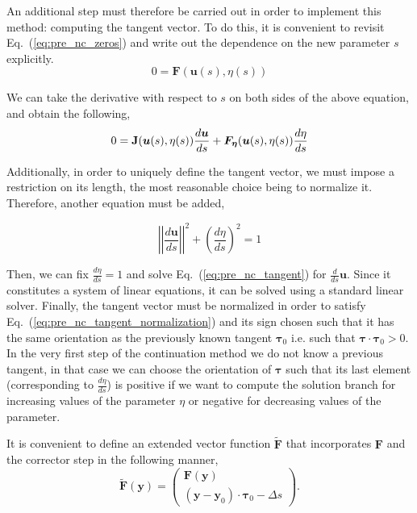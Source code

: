 An additional step must therefore be carried out in order to implement this method: computing 
the tangent vector. To do this, it is convenient to revisit Eq.~(\ref{eq:pre_nc_zeros}) and write out
the dependence on the new parameter $s$ explicitly.
\begin{equation}
    0 = \bm{F}(\bm{u}(s), \eta (s))
\end{equation}

We can take the derivative with respect to $s$ on both sides of the
above equation, and obtain the following,
\begin{equation}
    0 = \mathbf{J}(\bm{u}(s), \eta (s)) \frac{d \bm{u}}{ds} 
            + \bm{F_\eta}(\bm{u}(s), \eta (s)) \frac{d\eta}{ds}
    \label{eq:pre_nc_tangent}
\end{equation}

Additionally, in order to uniquely define the tangent vector, we must
impose a restriction on its length, the most reasonable choice being
to normalize it. Therefore, another equation must be added,

\begin{equation}
    \left|\left|\dfrac{d\bm{u}}{ds}\right|\right|^2 + \left(\dfrac{d\eta}{ds}\right)^2 = 1
    \label{eq:pre_nc_tangent_normalization}
\end{equation}

Then, we can fix $\frac{d \eta}{ds} = 1$ and solve Eq.~(\ref{eq:pre_nc_tangent}) for $\frac{d}{ds}\bm{u}$. Since
it constitutes a system of linear equations, it can be solved using a standard linear solver. Finally, 
the tangent vector must be normalized in order to satisfy Eq.~(\ref{eq:pre_nc_tangent_normalization})
and its sign chosen such that it has the same orientation as the previously
known tangent $\bm{\tau}_0$ i.e. such that $\bm{\tau} \cdot \bm{\tau}_0 > 0$. In the very first step
of the continuation method we do not know a previous tangent, in that case we can choose the
orientation of $\bm{\tau}$ such that its last element (corresponding to  $\frac{d \eta}{ds}$) is
positive if we want to compute the solution branch for increasing values of the parameter $\eta$ or negative
for decreasing values of the parameter.

It is convenient to define an extended vector function $\tilde{ \bm{F} }$ that incorporates $\bm{F}$
and the corrector step in the following manner,
\begin{equation}
    \tilde{\bm{F}}(\bm{y}) = 
    \begin{pmatrix}
        \bm{F}(\bm{y}) \\ 
        (\bm{y} - \bm{y}_0) \cdot \bm{\tau}_0 - \Delta s
    \end{pmatrix}.
    \label{eq:pre_nc_palc_system}
\end{equation} 


